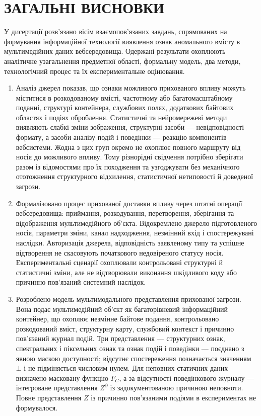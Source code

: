 \chapter*{ЗАГАЛЬНІ ВИСНОВКИ}
{}

У дисертації розв’язано вісім взаємопов’язаних завдань, спрямованих на формування інформаційної технології виявлення ознак аномального вмісту в мультимедійних даних вебсередовища. Одержані результати охоплюють аналітичне узагальнення предметної області, формальну модель, два методи, технологічний процес та їх експериментальне оцінювання.

\begin{enumerate}[label=\arabic*.]
\item Аналіз джерел показав, що ознаки можливого прихованого впливу можуть міститися в розкодованому вмісті, частотному або багатомасштабному поданні, структурі контейнера, службових полях, додаткових байтових областях і подіях оброблення. Статистичні та нейромережеві методи виявляють слабкі зміни зображення, структурні засоби --- невідповідності формату, а засоби аналізу подій і поведінки --- реакцію компонентів вебсистеми. Жодна з цих груп окремо не охоплює повного маршруту від носія до можливого впливу. Тому різнорідні свідчення потрібно зберігати разом із відомостями про їх походження та узгоджувати без механічного ототожнення структурного відхилення, статистичної нетиповості й доведеної загрози.

\item Формалізовано процес прихованої доставки впливу через штатні операції вебсередовища: приймання, розкодування, перетворення, зберігання та відображення мультимедійного об’єкта. Відокремлено джерело підготовленого носія, параметри зміни, канал надходження, незмінний вхід і спостережувані наслідки. Авторизація джерела, відповідність заявленому типу та успішне відтворення не скасовують початкового недовіреного статусу носія. Експериментальні сценарії охоплювали контрольовані структурні й статистичні зміни, але не відтворювали виконання шкідливого коду або причинно пов’язаний системний наслідок.

\item Розроблено модель мультимодального представлення прихованої загрози. Вона подає мультимедійний об’єкт як багаторівневий інформаційний контейнер, що охоплює незмінне байтове подання, контрольовано розкодований вміст, структурну карту, службовий контекст і причинно пов’язаний журнал подій. Три представлення --- структурних ознак, спектральних і піксельних ознак та ознак подій і поведінки --- поєднано з явною маскою доступності; відсутнє спостереження позначається значенням $\bot$ і не підміняється числовим нулем. Для неповних статичних даних визначено масковану функцію $F_C$, а за відсутності поведінкового журналу --- інтегроване представлення $Z^{\partial}$ із задокументованою причиною неповноти. Повне представлення $Z$ із причинно пов’язаними подіями в експериментах не формувалося.


\end{enumerate}
